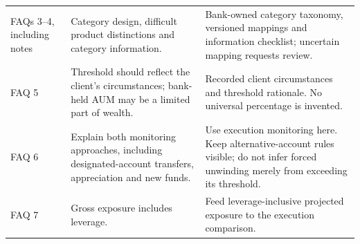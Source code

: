 \documentclass[12pt,a4paper,oneside,openany]{book}
\begin{document}
\begin{longtable}{P{0.14\textwidth}P{0.37\textwidth}P{0.39\textwidth}}
FAQs 3--4, including notes & Category design, difficult product distinctions and category information. & Bank-owned category taxonomy, versioned mappings and information checklist; uncertain mapping requests review.\\
FAQ 5 & Threshold should reflect the client's circumstances; bank-held AUM may be a limited part of wealth. & Recorded client circumstances and threshold rationale. No universal percentage is invented.\\
FAQ 6 & Explain both monitoring approaches, including designated-account transfers, appreciation and new funds. & Use execution monitoring here. Keep alternative-account rules visible; do not infer forced unwinding merely from exceeding its threshold.\\
FAQ 7 & Gross exposure includes leverage. & Feed leverage-inclusive projected exposure to the execution comparison.\\
\bottomrule
\end{longtable}
\endgroup
\end{document}
